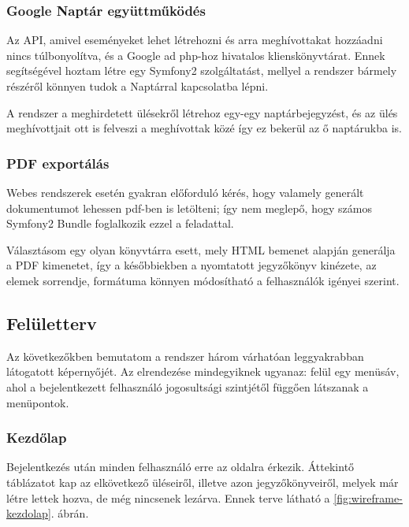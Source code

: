 \documentclass[a4paper,12pt,oneside]{report}
\begin{document}
\subsubsection{Google Naptár együttműködés}

Az API, amivel eseményeket lehet létrehozni és arra meghívottakat hozzáadni\cite{website:gcal_event_api} nincs túlbonyolítva, és a Google ad php-hoz hivatalos klienskönyvtárat\cite{website:google_api_client}. Ennek segítségével hoztam létre egy Symfony2 szolgáltatást, mellyel a rendszer bármely részéről könnyen tudok a Naptárral kapcsolatba lépni.

A rendszer a meghirdetett ülésekről létrehoz egy-egy naptárbejegyzést, és az ülés meghívottjait ott is felveszi a meghívottak közé \textendash{} így ez bekerül az ő naptárukba is.

\subsubsection{PDF exportálás}

Webes rendszerek esetén gyakran előforduló kérés, hogy valamely generált dokumentumot lehessen pdf-ben is letölteni; így nem meglepő, hogy számos Symfony2 Bundle foglalkozik ezzel a feladattal.

Választásom egy olyan könyvtárra esett, mely HTML bemenet alapján generálja a PDF kimenetet, így a későbbiekben a nyomtatott jegyzőkönyv kinézete, az elemek sorrendje, formátuma könnyen módosítható a felhasználók igényei szerint.

\subsection{Felületterv}

Az következőkben bemutatom a rendszer három várhatóan leggyakrabban látogatott képernyőjét. Az elrendezése mindegyiknek ugyanaz: felül egy menüsáv, ahol a bejelentkezett felhasználó jogosultsági szintjétől függően látszanak a menüpontok.

\subsubsection{Kezdőlap}

Bejelentkezés után minden felhasználó erre az oldalra érkezik. Áttekintő táblázatot kap az elkövetkező üléseiről, illetve azon jegyzőkönyveiről, melyek már létre lettek hozva, de még nincsenek lezárva. Ennek terve látható a \ref{fig:wireframe-kezdolap}. ábrán.
\end{document}
